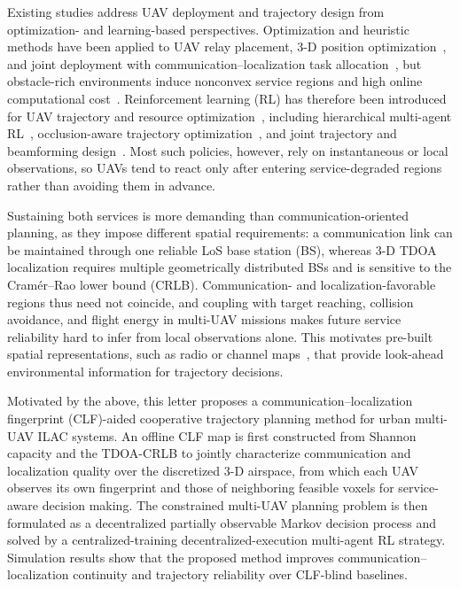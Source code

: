 \documentclass[lettersize,journal]{IEEEtran}
\begin{document}
Existing studies address UAV deployment and trajectory design from optimization- and learning-based perspectives. Optimization and heuristic methods have been applied to UAV relay placement, 3-D position optimization~\cite{ref7}, and joint deployment with communication--localization task allocation~\cite{ref8}, but obstacle-rich environments induce nonconvex service regions and high online computational cost~\cite{ref9}. Reinforcement learning (RL) has therefore been introduced for UAV trajectory and resource optimization~\cite{ref10}, including hierarchical multi-agent RL~\cite{ref9}, occlusion-aware trajectory optimization~\cite{ref11}, and joint trajectory and beamforming design~\cite{ref12}. Most such policies, however, rely on instantaneous or local observations, so UAVs tend to react only after entering service-degraded regions rather than avoiding them in advance.

Sustaining both services is more demanding than communication-oriented planning, as they impose different spatial requirements: a communication link can be maintained through one reliable LoS base station (BS), whereas 3-D TDOA localization requires multiple geometrically distributed BSs and is sensitive to the Cram\'er--Rao lower bound (CRLB). Communication- and localization-favorable regions thus need not coincide, and coupling with target reaching, collision avoidance, and flight energy in multi-UAV missions makes future service reliability hard to infer from local observations alone. This motivates pre-built spatial representations, such as radio or channel maps~\cite{ref13,ref14,ref15}, that provide look-ahead environmental information for trajectory decisions.

Motivated by the above, this letter proposes a communication--localization fingerprint (CLF)-aided cooperative trajectory planning method for urban multi-UAV ILAC systems. An offline CLF map is first constructed from Shannon capacity and the TDOA-CRLB to jointly characterize communication and localization quality over the discretized 3-D airspace, from which each UAV observes its own fingerprint and those of neighboring feasible voxels for service-aware decision making. The constrained multi-UAV planning problem is then formulated as a decentralized partially observable Markov decision process and solved by a centralized-training decentralized-execution multi-agent RL strategy. Simulation results show that the proposed method improves communication--localization continuity and trajectory reliability over CLF-blind baselines.
\end{document}
